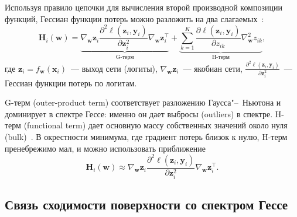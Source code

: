 Используя правило цепочки для вычисления второй производной композиции функций, Гессиан функции потерь можно разложить на два слагаемых~\cite{sagun2018empiricalanalysishessianoverparametrized}:
\begin{equation}
\label{eq:hessian-decomposition}
\mathbf{H}_i(\mathbf{w}) = \underbrace{\nabla_{\mathbf{w}} \mathbf{z}_i \frac{\partial^2 \ell(\mathbf{z}_i, \mathbf{y}_i)}{\partial \mathbf{z}_i^2} \nabla_{\mathbf{w}} \mathbf{z}_i^\top}_{\text{G-терм}} + \underbrace{\sum_{k=1}^K \frac{\partial \ell(\mathbf{z}_i, \mathbf{y}_i)}{\partial z_{ik}} \nabla^2_{\mathbf{w}} z_{ik}}_{\text{H-терм}},
\end{equation}
где $\mathbf{z}_i = f_{\mathbf{w}}(\mathbf{x}_i)$~--- выход сети (логиты), $\nabla_{\mathbf{w}} \mathbf{z}_i$~--- якобиан сети, $\frac{\partial^2 \ell(\mathbf{z}_i, \mathbf{y}_i)}{\partial \mathbf{z}_i^2}$~--- Гессиан функции потерь по логитам.

G-терм (outer-product term) соответствует разложению Гаусса"--~Ньютона и доминирует в спектре Гессе: именно он дает выбросы (outliers) в спектре. H-терм (functional term) дает основную массу собственных значений около нуля (bulk)~\cite{papyan2019spectrumdeepnethessiansscale}. В окрестности минимума, где градиент потерь близок к нулю, H-терм пренебрежимо мал, и можно использовать приближение
\begin{equation}
\label{eq:hessian-approximation}
\mathbf{H}_i(\mathbf{w}) \approx \nabla_{\mathbf{w}} \mathbf{z}_i \frac{\partial^2 \ell(\mathbf{z}_i, \mathbf{y}_i)}{\partial \mathbf{z}_i^2} \nabla_{\mathbf{w}} \mathbf{z}_i^\top.
\end{equation}

\subsection{Связь сходимости поверхности со спектром Гессе}

